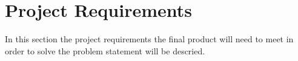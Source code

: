 \section{Project Requirements} \label{Requirements}
In this section the project requirements the final product will need to meet in order to solve the problem statement will be descried. 




